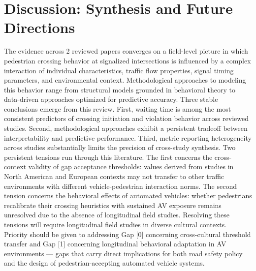\documentclass{article}
\begin{document}
\section{Discussion: Synthesis and Future Directions}
The evidence across 2 reviewed papers converges on a field-level picture in which pedestrian crossing behavior at signalized intersections is influenced by a complex interaction of individual characteristics, traffic flow properties, signal timing parameters, and environmental context. Methodological approaches to modeling this behavior range from structural models grounded in behavioral theory to data-driven approaches optimized for predictive accuracy. Three stable conclusions emerge from this review. First, waiting time is among the most consistent predictors of crossing initiation and violation behavior across reviewed studies. Second, methodological approaches exhibit a persistent tradeoff between interpretability and predictive performance. Third, metric reporting heterogeneity across studies substantially limits the precision of cross-study synthesis. Two persistent tensions run through this literature. The first concerns the cross-context validity of gap acceptance thresholds: values derived from studies in North American and European contexts may not transfer to other traffic environments with different vehicle-pedestrian interaction norms. The second tension concerns the behavioral effects of automated vehicles: whether pedestrians recalibrate their crossing heuristics with sustained AV exposure remains unresolved due to the absence of longitudinal field studies. Resolving these tensions will require longitudinal field studies in diverse cultural contexts. Priority should be given to addressing Gap [0] concerning cross-cultural threshold transfer and Gap [1] concerning longitudinal behavioral adaptation in AV environments — gaps that carry direct implications for both road safety policy and the design of pedestrian-accepting automated vehicle systems.
\end{document}
